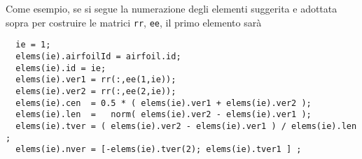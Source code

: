 \documentclass[11pt,fleqn]{article}
\begin{document}
Come esempio, se si segue la numerazione degli elementi suggerita e adottata sopra per costruire le matrici \texttt{rr}, \texttt{ee}, il primo elemento sarà
\begin{verbatim}
  ie = 1;
  elems(ie).airfoilId = airfoil.id;
  elems(ie).id = ie;
  elems(ie).ver1 = rr(:,ee(1,ie));
  elems(ie).ver2 = rr(:,ee(2,ie));
  elems(ie).cen  = 0.5 * ( elems(ie).ver1 + elems(ie).ver2 );
  elems(ie).len  =   norm( elems(ie).ver2 - elems(ie).ver1 );
  elems(ie).tver = ( elems(ie).ver2 - elems(ie).ver1 ) / elems(ie).len ;
  elems(ie).nver = [-elems(ie).tver(2); elems(ie).tver1 ] ;
\end{verbatim}
\end{document}
